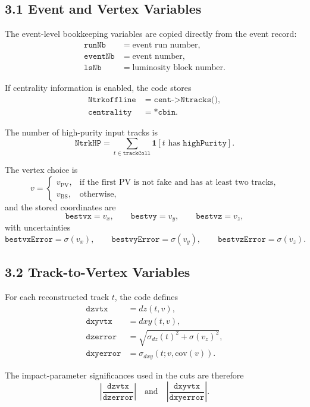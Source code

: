 \documentclass[11pt]{article}
\begin{document}
\subsection*{3.1 Event and Vertex Variables}

The event-level bookkeeping variables are copied directly from the event record:
\begin{align*}
\texttt{runNb} &= \text{event run number}, \\
\texttt{eventNb} &= \text{event number}, \\
\texttt{lsNb} &= \text{luminosity block number}.
\end{align*}

If centrality information is enabled, the code stores
\begin{align*}
\texttt{Ntrkoffline} &= \texttt{cent->Ntracks()}, \\
\texttt{centrality} &= \texttt{*cbin}.
\end{align*}

The number of high-purity input tracks is
\[
\texttt{NtrkHP}
=
\sum_{t \in \texttt{trackColl}}
\mathbf{1}\!\left[t \text{ has } \texttt{highPurity}\right].
\]

The vertex choice is
\[
v =
\begin{cases}
v_{\mathrm{PV}}, & \text{if the first PV is not fake and has at least two tracks},\\
v_{\mathrm{BS}}, & \text{otherwise},
\end{cases}
\]
and the stored coordinates are
\[
\texttt{bestvx}=v_x,\qquad
\texttt{bestvy}=v_y,\qquad
\texttt{bestvz}=v_z,
\]
with uncertainties
\[
\texttt{bestvxError}=\sigma(v_x),\qquad
\texttt{bestvyError}=\sigma(v_y),\qquad
\texttt{bestvzError}=\sigma(v_z).
\]

\subsection*{3.2 Track-to-Vertex Variables}

For each reconstructed track $t$, the code defines
\begin{align*}
\texttt{dzvtx} &= dz(t, v), \\
\texttt{dxyvtx} &= dxy(t, v), \\
\texttt{dzerror} &= \sqrt{\sigma_{dz}(t)^2 + \sigma(v_z)^2}, \\
\texttt{dxyerror} &= \sigma_{dxy}(t; v, \mathrm{cov}(v)).
\end{align*}

The impact-parameter significances used in the cuts are therefore
\[
\left|\frac{\texttt{dzvtx}}{\texttt{dzerror}}\right|
\quad\text{and}\quad
\left|\frac{\texttt{dxyvtx}}{\texttt{dxyerror}}\right|.
\]
\end{document}
